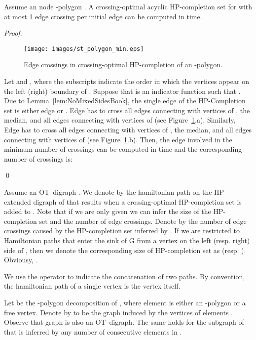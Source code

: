 \documentclass{myllncs-mixalis}
\begin{document}
\begin{lemma}
\label{lem:spineCrossingSTpolygon} Assume an  node  -polygon
. A crossing-optimal  acyclic
HP-completion set for  with at most 1 edge crossing per initial
edge can be computed in  time.
\end{lemma}

\begin{proof}
\begin{figure}[htb]
    \centering
    \texttt{[image: images/st\_polygon\_min.eps]}
    \caption{Edge crossings in crossing-optimal HP-completion of an -polygon.}
    \label{fig:HPcompletionPolygon}
\end{figure}

Let  and , where the subscripts indicate the order in which the
vertices appear on the left (right) boundary of . Suppose that
 is an indicator function such
that . Due to
Lemma~\ref{lem:NoMixedSidesBook}, the single edge of the
HP-Completion set is either edge  or . Edge  has to cross  all edges connecting
 with vertices of , the median, and all
edges connecting  with vertices of  (see
Figure~\ref{fig:HPcompletionPolygon}.a). Similarly, Edge  has to cross  all edges connecting  with vertices of , the median, and all  edges connecting  with
vertices of (see
Figure~\ref{fig:HPcompletionPolygon}.b). Then, the edge involved in
the minimum number of crossings can be computed in  time and
the corresponding number of crossings is:

\qed
\end{proof}



Assume an OT--digraph . We denote by  the hamiltonian
path on the HP-extended digraph of  that results when a
crossing-optimal HP-completion set is added to . Note that if we
are only given  we can infer the size of the HP-completion set
and the number of edge crossings. Denote by  the number of
edge crossings caused by the HP-completion set inferred by .
If we are restricted to Hamiltonian paths that enter the sink of G
from a vertex on the left (resp. right) side of , then we denote
the corresponding size of HP-completion set as  (resp.
). Obviousy, .


We use the operator  to indicate the concatenation of two
paths. By convention, the hamiltonian path of a single vertex is the
vertex itself.


Let  be the
-polygon decomposition of , where element  is either an -polygon or a free vertex. Denote by
 to be the graph induced by the vertices
of elements . Observe that graph  is also an
OT--digraph. The same holds for the subgraph of  that is
inferred by any number of consecutive elements in .
\end{document}
